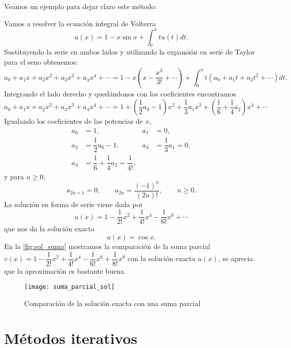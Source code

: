Veamos un ejemplo para dejar claro este método:
\begin{ejemplo}
	Vamos a resolver la ecuación integral de Volterra
	\begin{equation}
		u(x) = 1 - x \sin x + \int_{0}^{x} tu(t)dt.
	\end{equation}
	Sustituyendo la serie en ambos lados y utilizando la expansión en serie de Taylor para el seno obtenemos:
	\begin{equation}
		a_0 + a_1x + a_2x^2 + a_3x^3 + a_4x^4 +\cdots = 1 - x(x-\dfrac{x^3}{3!} + \cdots) + \int_{0}^{x}t(a_0+a_1t+a_2t^2+\cdots)dt.
	\end{equation}
	Integrando el lado derecho y quedándonos con los coeficientes encontramos
	\begin{equation}
		a_0 + a_1x + a_2x^2 + a_3x^3 + a_4x^4 + \cdots = 1+(\dfrac{1}{2}a_0-1)x^2+\dfrac{1}{3}a_1x^3+(\dfrac{1}{6}+\dfrac{1}{4}a_2)x^4+\cdots
	\end{equation}
	Igualando los coeficientes de las potencias de $x$,
	\begin{align}
		a_0&=1,          &  a_1&=0,      \\
		a_2&=\dfrac{1}{2}a_0-1,   &  a_3&=\dfrac{1}{3}a_1 = 0, \\
		a_4&=\dfrac{1}{6}+\dfrac{1}{4}a_2 = \dfrac{1}{4!},
	\end{align}
	y para $n\geqslant0$,
	\begin{equation}
		a_{2n+1} = 0, \qquad a_{2n} = \dfrac{(-1)^n}{(2n)!}, \qquad n \geqslant 0.
	\end{equation}
	La solución en forma de serie viene dada por
	\begin{equation}
		u(x) = 1 - \dfrac{1}{2!}x^2 + \dfrac{1}{4!}x^4-\dfrac{1}{6!}x^6+\cdots
	\end{equation}
	que nos da la solución exacta
	\begin{equation}
		u(x) = \cos x.
	\end{equation}
	En la \autoref{fig:sol_suma} mostramos la comparación de la suma parcial $v(x) = 1 - \dfrac{1}{2!}x^2 + \dfrac{1}{4!}x^4-\dfrac{1}{6!}x^6+\dfrac{1}{8!}x^8$ con la solución exacta $u(x)$, se aprecia que la aproximación es bastante buena.
	\begin{figure}[h!]
		\centering
		\texttt{[image: suma\_parcial\_sol]}
		\caption{Comparación de la solución exacta con una suma parcial}
		\label{fig:sol_suma}
	\end{figure}
\end{ejemplo}

\section{Métodos iterativos}

